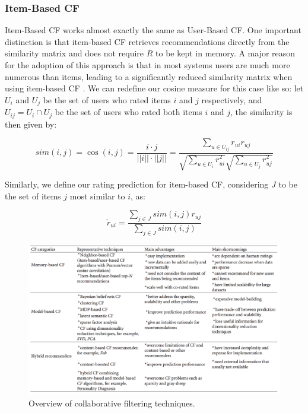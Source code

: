 \documentclass[cic,tc,english]{iiufrgs}
\begin{document}
\subsubsection{Item-Based CF}
Item-Based CF works almost exactly the same as User-Based CF. One important distinction is that item-based CF retrieves recommendations directly from the similarity matrix and does not require $R$ to be kept in memory. A major reason for the adoption of this approach is that in most systems users are much more numerous than items, leading to a significantly reduced similarity matrix when using item-based CF \cite{Sarwar2001}. We can redefine our cosine measure for this case like so: let $U_i$ and $U_j$ be the set of users who rated items $i$ and $j$ respectively, and $U_{ij} = U_i \cap U_j$ be the set of users who rated both items $i$ and $j$, the similarity is then given by:


\[sim( i,  j) = \cos(i,  j) = \frac { i \cdot j}{|| i|| \cdot || j||} = \frac{\sum_{u \in U_{ij}} r_{ui}r_{uj}}{\sqrt{\sum_{u \in U_i} r_{ui}^2}\sqrt{\sum_{u \in U_j} r_{uj}^2}}\]

Similarly, we define our rating prediction for item-based CF, considering $J$ to be the set of items $j$ most similar to $i$, as:

$$
\check{r}_{ui} = \frac{\sum_{j \in J} sim(i, j)r_{uj}}{\sum_{j \in J} sim(i, j)}
$$

\begin{figure}
    \caption{Overview of collaborative filtering techniques.}
    \begin{center}
        \includegraphics[width=35em]{cf-comparison}
    \end{center}
    \label{fig:cf-comparison}
\end{figure}
\end{document}
